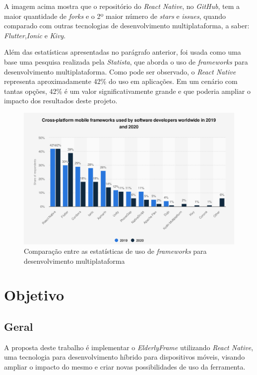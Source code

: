 \documentclass[
	12pt,				    %
	openright,			    %
	oneside,			    %
	a4paper,			    %
    sumario=tradicional,    %
	english,			    %
	brazil,				    %
	]{abntex2}              %
\begin{document}
A imagem acima mostra que o repositório do \textit{React Native}, no \textit{GitHub}, tem a maior quantidade de \textit{forks} e o 2º maior número de \textit{stars} e \textit{issues}, quando comparado com outras tecnologias de desenvolvimento multiplataforma, a saber: \textit{Flutter},\textit{Ionic} e \textit{Kivy}.

Além das estatísticas apresentadas no parágrafo anterior, foi usada como uma base uma pesquisa realizada pela \textit{Statista}, que aborda o uso de \textit{frameworks} para desenvolvimento multiplataforma. Como pode ser observado, o \textit{React Native} representa aproximadamente 42\% do uso em aplicações. Em um cenário com tantas opções, 42\% é um valor significativamente grande e que poderia ampliar o impacto dos resultados deste projeto.

\begin{figure}[H]
	\begin{center}
		\includegraphics[height=.5\linewidth]{mobile-frameworks-statista.png}
	\end{center}
	\caption[GitHub Compare]{Comparação entre as estatísticas de uso de \textit{frameworks} para desenvolvimento multiplataforma}
	\label{fig:statistaResearch}
\end{figure}

\chapter{Objetivo}\label{sec:objetivos}

\section{Geral}

A proposta deste trabalho é implementar o \emph{ElderlyFrame} utilizando \emph{React Native}, uma tecnologia para desenvolvimento híbrido para dispositivos móveis, visando ampliar o impacto do mesmo e criar novas possibilidades de uso da ferramenta.
\end{document}
